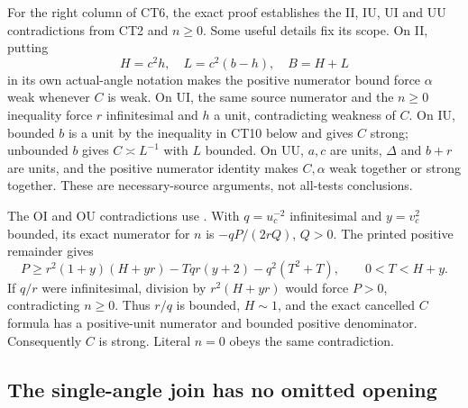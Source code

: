 For the right column of CT6, the exact proof
 establishes the II, IU, UI and UU
contradictions from CT2 and \(n\geq0\).
Some useful details fix its scope.  On II, putting
\[
 H=c^2h,\quad L=c^2(b-h),\quad B=H+L
\]
in its own actual-angle notation makes the positive numerator
bound force \(\alpha\) weak whenever \(C\) is weak.  On UI, the
same source numerator and the \(n\geq0\) inequality force
\(r\) infinitesimal and \(h\) a unit, contradicting weakness
of \(C\).  On IU, bounded \(b\) is a unit by the inequality in
CT10 below and gives \(C\) strong; unbounded \(b\) gives
\(C\asymp L^{-1}\) with \(L\) bounded.  On UU, \(a,c\) are units,
\(\Delta\) and \(b+r\) are units, and the positive numerator
identity makes \(C,\alpha\) weak together or strong together.
These are necessary-source arguments, not all-tests conclusions.

The OI and OU contradictions use
.
With \(q=u_c^{-2}\) infinitesimal and \(y=v_c^2\) bounded, its
exact numerator for \(n\) is \(-qP/(2rQ)\), \(Q>0\).
The printed positive remainder gives
\[
 P\geq r^2(1+y)(H+yr)-Tqr(y+2)-q^2(T^2+T),\qquad
 0<T<H+y .
\]
If \(q/r\) were infinitesimal, division by \(r^2(H+yr)\)
would force \(P>0\), contradicting \(n\geq0\).
Thus \(r/q\) is bounded, \(H\sim1\), and the exact cancelled
\(C\) formula has a positive-unit numerator and bounded
positive denominator.  Consequently \(C\) is strong.  Literal
\(n=0\) obeys the same contradiction.

\subsection{The single-angle join has no omitted opening}

